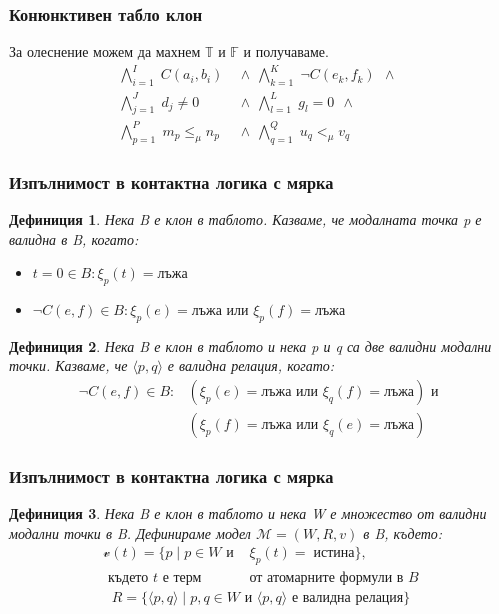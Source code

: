 \documentclass{beamer}
\newtheorem{defn}{Дефиниция}[section]
\newcommand{\vE}{\mathscr{v}}
\newcommand{\vBool}{\xi}
\newcommand{\signT}{\mathbb{T}}
\newcommand{\signF}{\mathbb{F}}
\begin{document}
\begin{frame}\frametitle{Конюнктивен табло клон}
		За олеснение можем да махнем $\signT \textit{ и } \signF$ и получаваме.
\begin{align*}
			\bigwedge_{i=1}^{I} \; C(a_i, b_i) \:\: & \wedge \:\: 
			\bigwedge_{k=1}^{K} \; \neg C(e_k, f_k) \:\: \wedge \:\: \\
			\bigwedge_{j=1}^{J} \; d_j \neq 0 \:\: & \wedge \:\:
			\bigwedge_{l=1}^{L} \; g_l = 0 \:\: \wedge \:\:\\
			\bigwedge_{p=1}^{P} \; m_p \le_\mu n_p \:\: &\wedge \:\:
			\bigwedge_{q=1}^{Q} \; u_q <_\mu v_q \:\:
\end{align*}%
\end{frame}

\begin{frame}\frametitle{Изпълнимост в контактна логика с мярка}
	\begin{defn}%
	Нека B е клон в таблото. Казваме, че модалната точка p е валидна в B, когато:
	\begin{itemize}
		\item $t = 0 \in B:  \vBool_{p}(t) = \textbf{лъжа}$
		\item $\neg C(e, f) \in B: \vBool_{p}(e) = \textbf{лъжа} \textit{ или } \vBool_{p}(f) = \textbf{лъжа}$
	\end{itemize}
	\end{defn}

	\begin{defn}
		Нека B е клон в таблото и нека p и q са две валидни модални точки. Казваме, че $\langle p, q \rangle$ е валидна релация, когато:
		\begin{align*}
				\neg C(e, f) \in B: &(\vBool_{p}(e) = \textbf{лъжа} \textit{ или } \vBool_{q}(f) = \textbf{лъжа}) \textit{ и } \\
				 &(\vBool_{p}(f) = \textbf{лъжа} \textit{ или } \vBool_{q}(e) = \textbf{лъжа})
		\end{align*}
	\end{defn}
\end{frame}

\begin{frame}\frametitle{Изпълнимост в контактна логика с мярка}
	\begin{defn}
Нека B е клон в таблото и нека W е множество от валидни модални точки в B. Дефинираме модел $\mathcal{M} = (W, R, v)$ в B, където:
		\begin{align*}
				\vE(t) = \{ p \; | \; p \in W \textit{ и } &\vBool_{p}(t) =\; \textit{истина} \}, \\
				\textit{ където t е терм } & \textit{от атомарните формули в B}
		\end{align*}
		\begin{align*}
				R = \{ \langle p, q \rangle\; | \; p, q \in W \textit{ и } \langle p, q \rangle \textit{ е валидна релация}\}
		\end{align*}
	\end{defn}
\end{frame}
\end{document}
